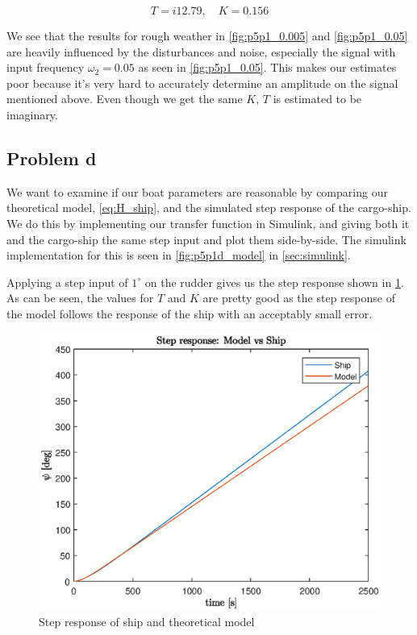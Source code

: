 \begin{equation}\label{eq:T_and_K_rough}
    T = i12.79, 
    \quad
    K = 0.156
\end{equation}

We see that the results for rough weather in \cref{fig:p5p1_0.005} and \cref{fig:p5p1_0.05} are heavily influenced by the disturbances and noise, especially the signal with input frequency $\omega_2 = 0.05$ as seen in \cref{fig:p5p1_0.05}. This makes our estimates poor because it's very hard to accurately determine an amplitude on the signal mentioned above. Even though we get the same $K$, $T$ is estimated to be imaginary.

\subsection{Problem d}
We want to examine if our boat parameters are reasonable by comparing our theoretical model, \cref{eq:H_ship}, and the simulated step response of the cargo-ship. We do this by implementing our transfer function in Simulink, and giving both it and the cargo-ship the same step input and plot them side-by-side. The simulink implementation for this is seen in \cref{fig:p5p1d_model} in \cref{sec:simulink}.

Applying a step input of $1^\circ$ on the rudder gives us the step response shown in \cref{fig:p5p1d_step_response}. As can be seen, the values for $T$ and $K$ are pretty good as the step response of the model follows the response of the ship with an acceptably small error.


\begin{figure}[h]
	\centering
	\includegraphics{figures/p5p1d.eps}
	\caption[width=\textwidth]{Step response of ship and theoretical model}
\label{fig:p5p1d_step_response}
\end{figure}

